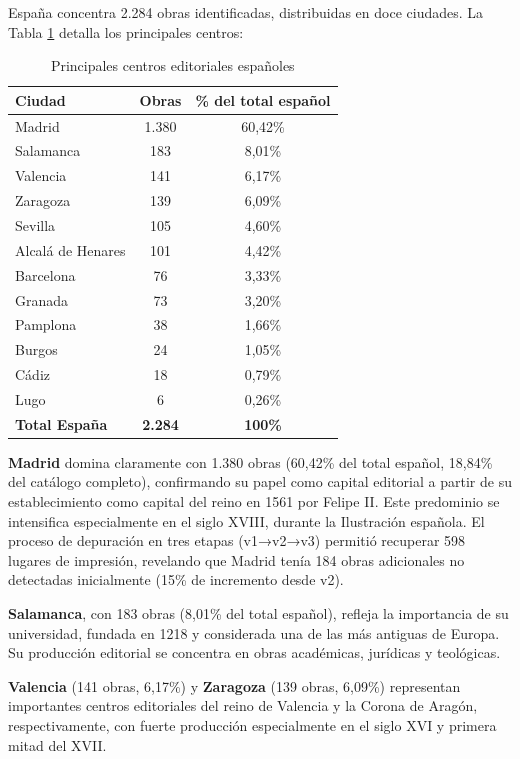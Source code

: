 \documentclass[12pt,a4paper]{article}
\begin{document}
España concentra 2.284 obras identificadas, distribuidas en doce ciudades. La Tabla \ref{tab:espana} detalla los principales centros:

\begin{table}[h]
\centering
\caption{Principales centros editoriales españoles}
\label{tab:espana}
\begin{tabular}{lcc}
\toprule
\textbf{Ciudad} & \textbf{Obras} & \textbf{\% del total español} \\
\midrule
Madrid & 1.380 & 60,42\% \\
Salamanca & 183 & 8,01\% \\
Valencia & 141 & 6,17\% \\
Zaragoza & 139 & 6,09\% \\
Sevilla & 105 & 4,60\% \\
Alcalá de Henares & 101 & 4,42\% \\
Barcelona & 76 & 3,33\% \\
Granada & 73 & 3,20\% \\
Pamplona & 38 & 1,66\% \\
Burgos & 24 & 1,05\% \\
Cádiz & 18 & 0,79\% \\
Lugo & 6 & 0,26\% \\
\midrule
\textbf{Total España} & \textbf{2.284} & \textbf{100\%} \\
\bottomrule
\end{tabular}
\end{table}

\textbf{Madrid} domina claramente con 1.380 obras (60,42\% del total español, 18,84\% del catálogo completo), confirmando su papel como capital editorial a partir de su establecimiento como capital del reino en 1561 por Felipe II. Este predominio se intensifica especialmente en el siglo XVIII, durante la Ilustración española. El proceso de depuración en tres etapas (v1→v2→v3) permitió recuperar 598 lugares de impresión, revelando que Madrid tenía 184 obras adicionales no detectadas inicialmente (15\% de incremento desde v2).

\textbf{Salamanca}, con 183 obras (8,01\% del total español), refleja la importancia de su universidad, fundada en 1218 y considerada una de las más antiguas de Europa. Su producción editorial se concentra en obras académicas, jurídicas y teológicas.

\textbf{Valencia} (141 obras, 6,17\%) y \textbf{Zaragoza} (139 obras, 6,09\%) representan importantes centros editoriales del reino de Valencia y la Corona de Aragón, respectivamente, con fuerte producción especialmente en el siglo XVI y primera mitad del XVII.
\end{document}

